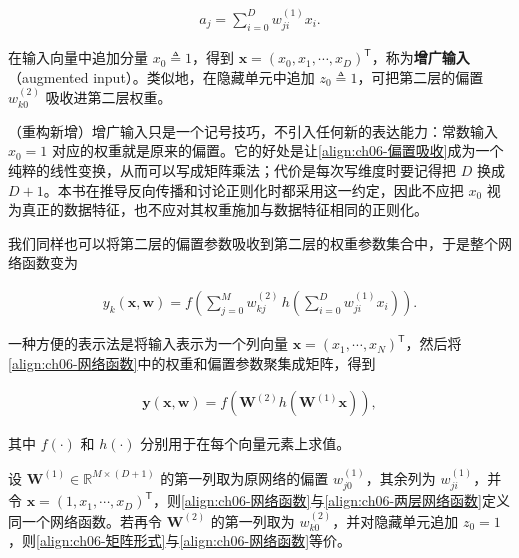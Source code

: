 \documentclass[../../main.tex]{subfiles}
\begin{document}
\begin{align}
a_j=\sum_{i=0}^{D}w_{ji}^{(1)}x_i.
\label{align:ch06-偏置吸收}
\end{align}

\begin{definition}[增广输入]\label{definition:ch06-增广输入}
在输入向量中追加分量 $x_0\triangleq1$，得到 $\boldsymbol{x}=(x_0,x_1,\cdots,x_D)^{\mathsf T}$，称为\textbf{增广输入}（augmented input）。类似地，在隐藏单元中追加 $z_0\triangleq1$，可把第二层的偏置 $w_{k0}^{(2)}$ 吸收进第二层权重。
\end{definition}

\begin{remark}（重构新增）增广输入只是一个记号技巧，不引入任何新的表达能力：常数输入 $x_0=1$ 对应的权重就是原来的偏置。它的好处是让\eqref{align:ch06-偏置吸收}成为一个纯粹的线性变换，从而可以写成矩阵乘法；代价是每次写维度时要记得把 $D$ 换成 $D+1$。本书在推导反向传播和讨论正则化时都采用这一约定，因此不应把 $x_0$ 视为真正的数据特征，也不应对其权重施加与数据特征相同的正则化。
\end{remark}

我们同样也可以将第二层的偏置参数吸收到第二层的权重参数集合中，于是整个网络函数变为

\begin{align}
y_k(\boldsymbol{x},\boldsymbol{w})=f\!\left(\sum_{j=0}^{M}w_{kj}^{(2)}\,h\!\left(\sum_{i=0}^{D}w_{ji}^{(1)}x_i\right)\right).
\label{align:ch06-网络函数}
\end{align}

一种方便的表示法是将输入表示为一个列向量 $\boldsymbol{x}=(x_1,\cdots,x_N)^{\mathsf T}$，然后将\eqref{align:ch06-网络函数}中的权重和偏置参数聚集成矩阵，得到

\begin{align}
\boldsymbol{y}(\boldsymbol{x},\boldsymbol{w})=f\!\left(\boldsymbol{W}^{(2)}h\!\left(\boldsymbol{W}^{(1)}\boldsymbol{x}\right)\right),
\label{align:ch06-矩阵形式}
\end{align}

其中 $f(\cdot)$ 和 $h(\cdot)$ 分别用于在每个向量元素上求值。

\begin{proposition}[偏置吸收的等价性]\label{proposition:ch06-偏置吸收}
设 $\boldsymbol{W}^{(1)}\in\mathbb{R}^{M\times(D+1)}$ 的第一列取为原网络的偏置 $w_{j0}^{(1)}$，其余列为 $w_{ji}^{(1)}$，并令 $\boldsymbol{x}=(1,x_1,\cdots,x_D)^{\mathsf T}$，则\eqref{align:ch06-网络函数}与\eqref{align:ch06-两层网络函数}定义同一个网络函数。若再令 $\boldsymbol{W}^{(2)}$ 的第一列取为 $w_{k0}^{(2)}$，并对隐藏单元追加 $z_0=1$，则\eqref{align:ch06-矩阵形式}与\eqref{align:ch06-网络函数}等价。
\end{proposition}
\end{document}
